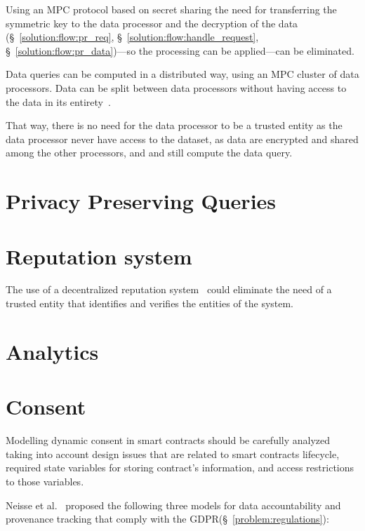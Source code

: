 Using an MPC protocol based on secret sharing the need for transferring the symmetric key to the data processor and the decryption of the data (§~\ref{solution:flow:pr_req}, §~\ref{solution:flow:handle_request}, §~\ref{solution:flow:pr_data})---so the processing can be applied---can be eliminated.

Data queries can be computed in a distributed way, using an MPC cluster of data processors. Data can be split between data processors without having access to the data in its entirety~\cite{DBLP:journals/corr/ZyskindNP15}.

That way, there is no need for the data processor to be a trusted entity as the data processor never have access to the dataset, as data are encrypted and shared among the other processors, and and still compute the data query.

\section{Privacy Preserving Queries}
\label{future_work:ppq}

\section{Reputation system}
\label{future_work:ranking_system}

The use of a decentralized reputation system~\cite{trust_is_risk} could eliminate the need of a trusted entity that identifies and verifies the entities of the system.

\section{Analytics}
\label{future_work:analytics}

\section{Consent}
\label{future_work:consent}

Modelling dynamic consent in smart contracts should be carefully analyzed taking into account design issues that are related to smart contracts lifecycle, required state variables for storing contract’s information, and access restrictions to those variables.

Neisse et al.~\cite{DBLP:journals/corr/NeisseSF17} proposed the following three models for data accountability and provenance tracking that comply with the GDPR(§~\ref{problem:regulations}):


